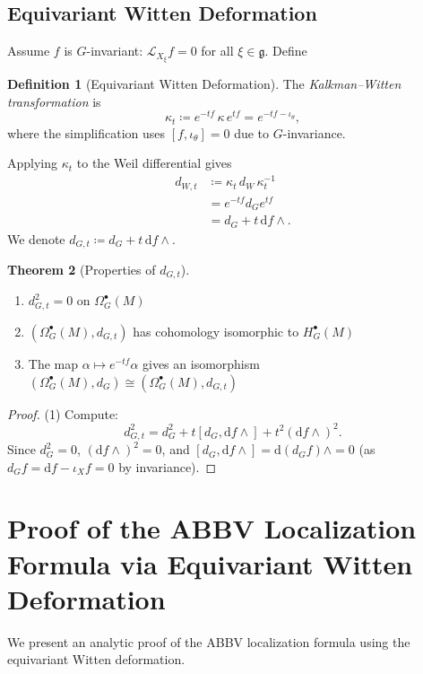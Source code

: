 \documentclass[10pt]{article}
\theoremstyle{definition}
\newtheorem{definition}{Definition}[section]
\newtheorem{theorem}[definition]{Theorem}
\newcommand{\diff}{\mathrm{d}}
\newcommand{\lie}[1]{\mathcal{L}_{#1}}
\newcommand{\cont}[1]{\iota_{#1}}
\begin{document}
\subsection{Equivariant Witten Deformation}\label{sec:equiv-witten}
Assume $f$ is $G$-invariant: $\lie{X_\xi}f = 0$ for all $\xi \in \mathfrak{g}$. Define
\begin{definition}[Equivariant Witten Deformation]
The \emph{Kalkman--Witten transformation} is
\begin{equation}\label{eq:kalkman-witten}
    \kappa_{t} \coloneqq e^{-tf} \, \kappa \, e^{tf} = e^{-tf - \cont{\theta}},
\end{equation}
where the simplification uses $[f, \cont{\theta}] = 0$ due to $G$-invariance.
\end{definition}

Applying $\kappa_t$ to the Weil differential gives
\begin{align}
    d_{W,t} &\coloneqq \kappa_{t} \, d_{W} \, \kappa_{t}^{-1} \nonumber \\
            &= e^{-tf} d_{G} e^{tf} \label{eq:equiv-witten-diff} \\
            &= d_{G} + t \, \diff f \wedge . \nonumber
\end{align}
We denote $d_{G,t} \coloneqq d_G + t\, \diff f \wedge$.

\begin{theorem}[Properties of $d_{G,t}$]
\begin{enumerate}
    \item $d_{G,t}^2 = 0$ on $\Omega_G^\bullet(M)$
    \item $(\Omega_G^\bullet(M), d_{G,t})$ has cohomology isomorphic to $H_G^\bullet(M)$
    \item The map $\alpha \mapsto e^{-tf}\alpha$ gives an isomorphism $(\Omega_G^\bullet(M), d_G) \cong (\Omega_G^\bullet(M), d_{G,t})$
\end{enumerate}
\end{theorem}
\begin{proof}
(1) Compute:
\begin{equation}
d_{G,t}^2 = d_G^2 + t[d_G, \diff f \wedge] + t^2(\diff f \wedge)^2.
\end{equation}
Since $d_G^2 = 0$, $(\diff f \wedge)^2 = 0$, and $[d_G, \diff f \wedge] = \diff(d_G f) \wedge = 0$ (as $d_G f = \diff f - \cont{X}f = 0$ by invariance).
\end{proof}

\section{Proof of the ABBV Localization Formula via Equivariant Witten Deformation}\label{sec:abbv-proof}
We present an analytic proof of the ABBV localization formula using the equivariant Witten deformation.
\end{document}
